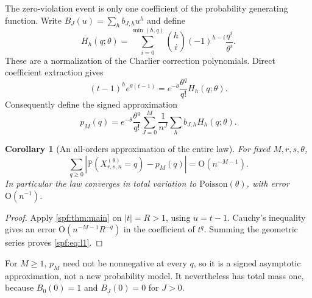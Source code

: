 \documentclass[11pt]{article}
\numberwithin{equation}{section}
\newtheorem{corollary}[theorem]{Corollary}
\theoremstyle{definition}
\theoremstyle{remark}
\theoremstyle{definition}
\newcommand{\Pp}{\mathbb P}
\newcommand{\fall}[2]{{#1}^{\underline{#2}}}
\newcommand{\bigO}{\mathrm O}
\begin{document}
The zero-violation event is only one coefficient of the probability generating
function. Write $B_J(u)=\sum_h b_{J,h}u^h$ and define
\begin{equation}
 H_h(q;\theta)=\sum_{i=0}^{\min(h,q)}
      \binom hi(-1)^{h-i}\frac{\fall qi}{\theta^i}.
 \label{spf:eq:Charlier}
\end{equation}
These are a normalization of the Charlier correction polynomials.
Direct coefficient extraction gives
\begin{equation}
 [t^q](t-1)^h e^{\theta(t-1)}
 =e^{-\theta}\frac{\theta^q}{q!}H_h(q;\theta).
\end{equation}
Consequently define the signed approximation
\begin{equation}
 p_M(q)=e^{-\theta}\frac{\theta^q}{q!}
   \sum_{J=0}^{M}\frac1{n^J}\sum_h b_{J,h}H_h(q;\theta).
 \label{spf:eq:pmf}
\end{equation}

\begin{corollary}[An all-orders approximation of the entire law]
\label{spf:cor:distribution}
For fixed $M,r,s,\theta$,
\begin{equation}
 \sum_{q\ge0}\left|\Pp(X^{(\theta)}_{r,s,n}=q)-p_M(q)\right|
 =\bigO(n^{-M-1}).
 \label{spf:eq:l1}
\end{equation}
In particular the law converges in total variation to
$\mathrm{Poisson}(\theta)$, with error $\bigO(n^{-1})$.
\end{corollary}
\begin{proof}
Apply \cref{spf:thm:main} on $|t|=R>1$, using $u=t-1$. Cauchy's inequality gives
an error $\bigO(n^{-M-1}R^{-q})$ in the coefficient of $t^q$. Summing the
geometric series proves \eqref{spf:eq:l1}.
\end{proof}

For $M\ge1$, $p_M$ need not be nonnegative at every $q$, so it is a signed
asymptotic approximation, not a new probability model. It nevertheless has
total mass one, because $B_0(0)=1$ and $B_J(0)=0$ for $J>0$.
\end{document}
